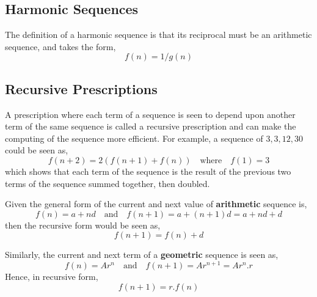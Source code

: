     \subsection{Harmonic Sequences}
        The definition of a harmonic sequence is that its reciprocal must be an arithmetic sequence, and takes the 
        form,
        \begin{equation}
            f(n) = 1 / g(n)
        \end{equation}

    \subsection{Recursive Prescriptions}
        A prescription where each term of a sequence is seen to depend upon another term of the same sequence is called
        a recursive prescription and can make the computing of the sequence more efficient. For example, a sequence of 
        \(3, 3, 12, 30\) could be seen as,
        \begin{equation}
            f(n+2) = 2(f(n+1) + f(n)) \quad \textrm{where} \quad f(1) = 3
        \end{equation}
        which shows that each term of the sequence is the result of the previous two terms of the sequence summed 
        together, then doubled.
        \par \hfill \break
        Given the general form of the current and next value of \textbf{arithmetic} sequence is,
        \begin{equation}
            f(n) = a + nd \quad \textrm{and} \quad f(n+1) = a + (n+1)d = a + nd + d
        \end{equation}
        then the recursive form would be seen as,
        \begin{equation}
            f(n+1) = f(n) + d
        \end{equation}
        \par \hfill \break
        Similarly, the current and next term of a \textbf{geometric} sequence is seen as,
        \begin{equation}
            f(n) = Ar^n \quad \textrm{and} \quad f(n+1) = Ar^{n+1} = Ar^n.r
        \end{equation}
        Hence, in recursive form,
        \begin{equation}
            f(n+1) = r.f(n)
        \end{equation}

